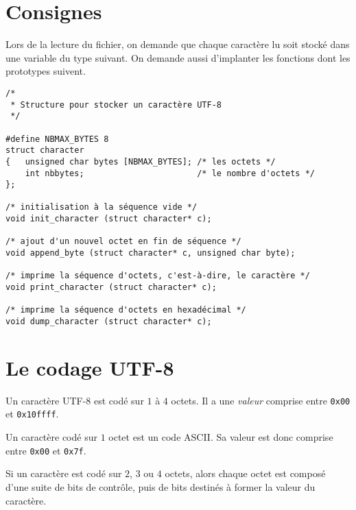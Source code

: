 \documentclass[12pt]{article}
\newcounter{points_counter}
\newcounter{section_points_counter}
\begin{document}
\section{Consignes}

Lors de la lecture du fichier, on demande que chaque caractère lu
soit stocké dans une variable du type suivant. On demande aussi 
d'implanter les fonctions dont les prototypes suivent.
\begin{verbatim}
/* 
 * Structure pour stocker un caractère UTF-8 
 */

#define NBMAX_BYTES 8
struct character
{   unsigned char bytes [NBMAX_BYTES]; /* les octets */
    int nbbytes;                       /* le nombre d'octets */
};

/* initialisation à la séquence vide */
void init_character (struct character* c);

/* ajout d'un nouvel octet en fin de séquence */
void append_byte (struct character* c, unsigned char byte);

/* imprime la séquence d'octets, c'est-à-dire, le caractère */
void print_character (struct character* c);

/* imprime la séquence d'octets en hexadécimal */
void dump_character (struct character* c);
\end{verbatim}

\section{Le codage UTF-8}

Un caractère UTF-8 est codé sur $1$ à $4$ octets.
Il a une {\em valeur} comprise entre {\tt 0x00} et {\tt 0x10ffff}.

Un caractère codé sur $1$ octet est un code ASCII. Sa valeur
est donc comprise entre {\tt 0x00} et {\tt 0x7f}.

Si un caractère est codé sur $2$, $3$ ou $4$ octets, alors chaque
octet est composé d'une suite de bits de contrôle, puis de
bits destinés à former la valeur du caractère.
\end{document}
